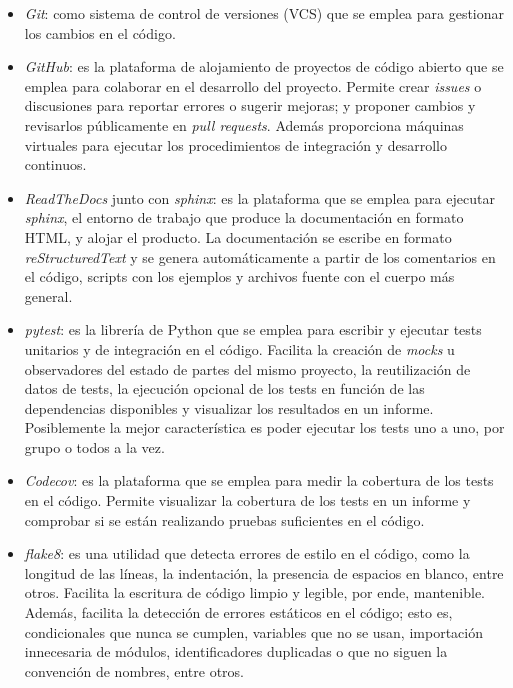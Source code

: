 \begin{itemize}
    \item \textit{Git}: como sistema de control de versiones (\gls{VCS}) que se emplea para gestionar los cambios en el código.
    \item \textit{GitHub}: es la plataforma de alojamiento de proyectos de código abierto que se emplea para colaborar en el desarrollo del proyecto. Permite crear \textit{issues} o discusiones para reportar errores o sugerir mejoras; y proponer cambios y revisarlos públicamente en \textit{pull requests}. Además proporciona máquinas virtuales para ejecutar los procedimientos de integración y desarrollo continuos.
    \item \textit{ReadTheDocs} junto con \textit{sphinx}: es la plataforma que se emplea para ejecutar \textit{sphinx}, el entorno de trabajo que produce la documentación en formato \gls{HTML}, y alojar el producto. La documentación se escribe en formato \textit{\gls{reStructuredText}} y se genera automáticamente a partir de los comentarios en el código, \glspl{script} con los ejemplos y archivos fuente con el cuerpo más general.
    \item \textit{pytest}: es la librería de \gls{Python} que se emplea para escribir y ejecutar tests unitarios y de integración en el código. Facilita la creación de \textit{\gls{mocks}} u observadores del estado de partes del mismo proyecto, la reutilización de datos de tests, la ejecución opcional de los tests en función de las dependencias disponibles y visualizar los resultados en un informe. Posiblemente la mejor característica es poder ejecutar los tests uno a uno, por grupo o todos a la vez.
    \item \textit{Codecov}: es la plataforma que se emplea para medir la cobertura de los tests en el código. Permite visualizar la cobertura de los tests en un informe y comprobar si se están realizando pruebas suficientes en el código.
    \item \textit{flake8}: es una utilidad que detecta errores de estilo en el código, como la longitud de las líneas, la \gls{indentación}, la presencia de espacios en blanco, entre otros. Facilita la escritura de código limpio y legible, por ende, mantenible.
          Además, facilita la detección de errores estáticos en el código; esto es, condicionales que nunca se cumplen, variables que no se usan, importación innecesaria de módulos, identificadores duplicadas o que no siguen la convención de nombres, entre otros.

\end{itemize}

